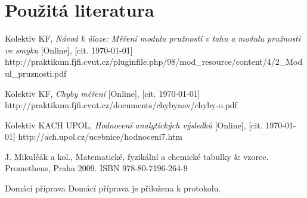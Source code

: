 \documentclass[english]{article}
\begin{document}
\section {Použitá literatura}
\begingroup
\renewcommand{\section}[2]{}

\begin{thebibliography}{9}
 Kolektiv KF, \emph{Návod k úloze: Měření modulu pružnosti v tahu a modulu pružnosti ve smyku} [Online], [cit. \today] \newline 
http://praktikum.fjfi.cvut.cz/pluginfile.php/98/mod\_resource/content/4/2\_Modul\_pruznosti.pdf



 Kolektiv KF, \emph{Chyby měření} [Online], [cit. \today] \newline http://praktikum.fjfi.cvut.cz/documents/chybynav/chyby-o.pdf

 Kolektiv KACH UPOL, \emph{Hodnocení analytických výsledků} [Online], [cit. \today] \newline http://ach.upol.cz/ucebnice/hodnoceni7.htm

 J. Mikulčák a kol., Matematické, fyzikální a chemické tabulky \& vzorce. Prometheus,
Praha 2009.\newline
ISBN 978-80-7196-264-9

\end{thebibliography}
\endgroup
\setcounter{equation}{0}
\clearpage
\section{Přílohy}

\subsection{Domácí příprava}
	Domácí příprava je přiložena k protokolu.
\end{document}
